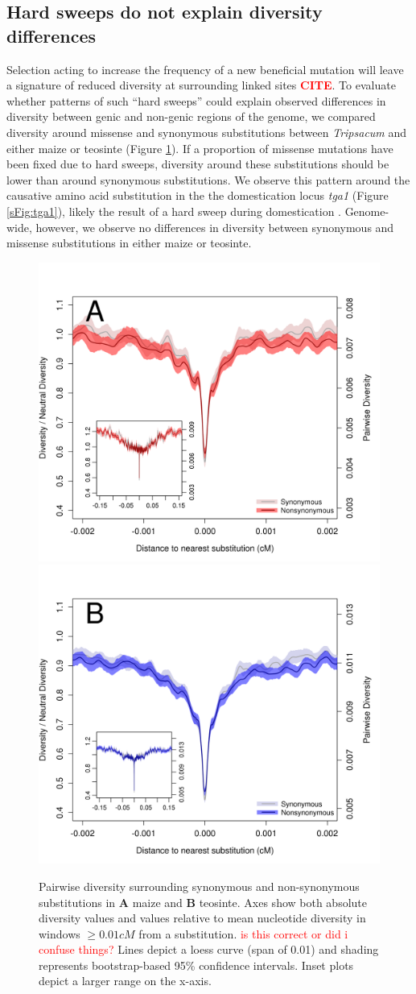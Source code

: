 \documentclass{pnastwo}
\newcommand{\jri}[1]{\textcolor{red}{\scriptsize #1}}
\newcommand{\citex}{\textcolor{red}{\bf CITE}}
\begin{document}
\begin{article}
\subsection{Hard sweeps do not explain diversity differences}
Selection acting to increase the frequency of a new beneficial mutation will leave a signature of reduced diversity at surrounding linked sites \citex.
To evaluate whether patterns of such ``hard sweeps'' could explain observed differences in diversity between genic and non-genic regions of the genome, we compared diversity around missense and synonymous substitutions between \emph{Tripsacum} and either maize or teosinte (Figure
\ref{fig:hardSweeps}).
If a proportion of missense mutations have been fixed due to hard sweeps, diversity around these substitutions should be lower than around synonymous substitutions. 
We observe this pattern around the causative amino acid substitution in the the domestication locus \emph{tga1} (Figure \ref{sFig:tga1}), likely the result of a hard sweep during domestication \cite{wang2005origin, wang2015}.
Genome-wide, however, we observe no differences in diversity between synonymous and missense substitutions in either maize or teosinte.

\begin{figure}
\centering
\includegraphics[width=.45\textwidth]{FigsAndFiles/plotDiversity_TvM_Folded2_Significance_Aug}
\hspace{0.05\textwidth} \includegraphics[width=.45\textwidth]{FigsAndFiles/plotDiversity_TvT_Folded2_Significance_Aug}
\caption{Pairwise diversity surrounding synonymous and non-synonymous
  substitutions in {\bf A} maize and {\bf B} teosinte. Axes show both absolute diversity values and values relative to mean nucleotide diversity in windows $\geq 0.01 cM$ from a substitution. \jri{is this correct or did i confuse things?}
 Lines depict a loess curve (span of 0.01) and shading represents bootstrap-based 95\% confidence intervals. Inset plots depict a larger range on the x-axis. \label{fig:hardSweeps}}
\end{figure}


\end{article}
\end{document}
